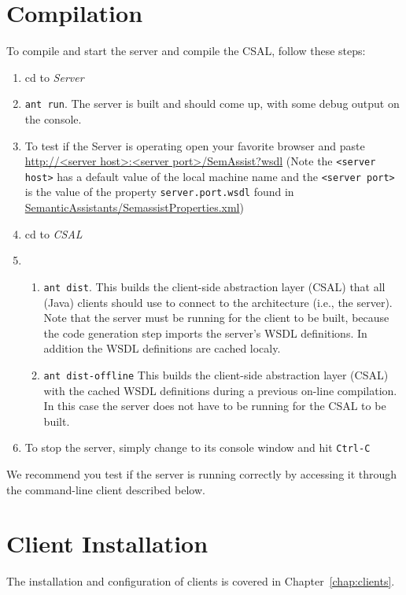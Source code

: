 \section{Compilation} 
\label{sec:inst-comp}
To compile and start the
server and compile the CSAL, follow these steps:

\begin{enumerate}
  \item cd to \emph{Server}
  \item \texttt{ant run}. The server is built and should come up, with
    some debug output on the console.
  \item To test if the Server is operating open your favorite browser and paste  \url{http://<server host>:<server port>/SemAssist?wsdl}
(Note the \texttt{<server host>} has a default value of the local machine name and the \texttt{<server port>} is the value of the property \texttt{server.port.wsdl}
found in \url{SemanticAssistants/SemassistProperties.xml})
  \item cd to \emph{CSAL}
  \item 
\begin{enumerate}
\item  \texttt{ant dist}. This builds the client-side abstraction
    layer (CSAL) that all (Java) clients should use to connect to the
    architecture (i.e., the server). Note that the server must be
    running for the client to be built, because the code generation
    step imports the server's WSDL definitions. In addition the WSDL definitions
    are cached localy.
\item  \texttt{ant dist-offline}
This builds the client-side abstraction
layer (CSAL) with the cached WSDL definitions during a previous on-line compilation.
In this case the server does not have to be running for the CSAL to be built.
\end{enumerate}

  \item To stop the server, simply change to its console window and
    hit \texttt{Ctrl-C}
\end{enumerate}
We recommend you test if the server is running correctly by accessing
it through the command-line client described below.



\section{Client Installation}
The installation and configuration of clients is covered in
Chapter~\ref{chap:clients}.


